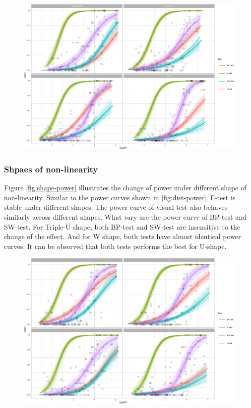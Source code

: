 \documentclass[]{interact}
\theoremstyle{plain}%
\theoremstyle{definition}
\theoremstyle{remark}
\begin{document}
\begin{figure}
\centering
\includegraphics{paper_comparison_files/figure-latex/dist-power-1.pdf}
\caption{\label{dist-power}}
\end{figure}

\hypertarget{shpaes-of-non-linearity}{%
\subsubsection{Shpaes of non-linearity}\label{shpaes-of-non-linearity}}

Figure \ref{fig:shape-power} illustrates the change of power under
different shape of non-linearity. Similar to the power curves shown in
\ref{fig:dist-power}, F-test is stable under different shapes. The power
curve of visual test also behaves similarly across different shapes.
What vary are the power curve of BP-test and SW-test. For Triple-U
shape, both BP-test and SW-test are insensitive to the change of the
effect. And for W shape, both tests have almost identical power curves.
It can be observed that both tests performs the best for U-shape.

\begin{figure}
\centering
\includegraphics{paper_comparison_files/figure-latex/shape-power-1.pdf}
\caption{\label{shape-power}}
\end{figure}
\end{document}
